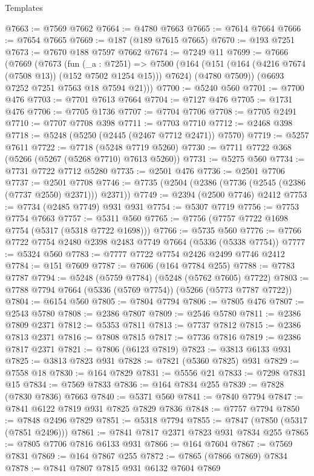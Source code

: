 \begin{lexlean}{Templates}
\begin{coremodule}
@7663 := @7569 @7662
@7664 := @4780 @7663
@7665 := @7614 @7664
@7666 := @7654 @7665
@7669 := @187 (@189 @7615 @7665)
@7670 := @193 @7251
@7673 := @7670 @188 @7597 @7662
@7674 := @7249 @11
@7699 := @7666
    (@7669
      (@7673
        (fun (_a : @7251) =>
        @7500
          (@164 (@151 (@164 (@4216 @7674 (@7508 @13)) (@152 @7502 @1254 @15))) @7624)
          (@4780 @7509))
        (@6693 @7252 @7251 @7563 @18 @7594 @21)))
@7700 := @5240 @560
@7701 := @7700 @476
@7703 := @7701 @7613 @7664
@7704 := @7127 @476
@7705 := @1731 @476
@7706 := @7705 @1736
@7707 := @7704 @7706
@7708 := @7705 @2491
@7710 := @7707 @7708 @398
@7711 := @7703 @7710
@7712 := @2468 @398
@7718 := @5248 (@5250 (@2445 (@2467 @7712 @2471)) @7570)
@7719 := @5257 @7611
@7722 := @7718 (@5248 @7719 @5260)
@7730 := @7711 @7722 @368 (@5266 (@5267 (@5268 @7710) @7613 @5260))
@7731 := @5275 @560
@7734 := @7731 @7722 @7712 @5280
@7735 := @2501 @476
@7736 := @2501 @7706
@7737 := @2501 @7708
@7746 := @7735 (@2504 (@2386 (@7736 (@2545 (@2386 (@7737 @2550) @2371))) @2371))
@7749 := @2394 (@2500 @7746) @2412
@7753 := @7734 (@2485 @7749) @931 @931
@7754 := @5307 @7719
@7756 := @7753 @7754 @7663
@7757 := @5311 @560
@7765 := @7756 (@7757 @7722 @1698 @7754 (@5317 (@5318 @7722 @1698)))
@7766 := @5735 @560
@7776 := @7766 @7722 @7754 @2480 @2398 @2483 @7749 @7664 (@5336 (@5338 @7754))
@7777 := @5324 @560
@7783 := @7777 @7722 @7754 @2426 @2499 @7746 @2412
@7784 := @151 @7609
@7787 := @7606 (@164 @7784 @255)
@7788 := @7783 @7787
@7794 := @5248 (@5759 @7784) (@5248 (@5762 @7605) @7722)
@7803 := @7788 @7794 @7664 (@5336 (@5769 @7754)) (@5266 (@5773 @7787 @7722))
@7804 := @6154 @560
@7805 := @7804 @7794
@7806 := @7805 @476
@7807 := @2543 @5780
@7808 := @2386 @7807
@7809 := @2546 @5780
@7811 := @2386 @7809 @2371
@7812 := @5353 @7811
@7813 := @7737 @7812
@7815 := @2386 @7813 @2371
@7816 := @7808 @7815
@7817 := @7736 @7816
@7819 := @2386 @7817 @2371
@7821 := @7806 (@6123 @7819)
@7823 := @3813 @6133 @931
@7825 := @3813 @7823 @931
@7828 := @7821 (@5360 @7825) @931
@7829 := @7558 @18
@7830 := @164 @7829
@7831 := @5556 @21
@7833 := @7298 @7831 @15
@7834 := @7569 @7833
@7836 := @164 @7834 @255
@7839 := @7828 (@7830 @7836) @7663
@7840 := @5371 @560
@7841 := @7840 @7794
@7847 := @7841 @6122 @7819 @931 @7825 @7829 @7836
@7848 := @7757 @7794
@7850 := @7848 @2496 @7829
@7851 := @5318 @7794
@7855 := @7847 (@7850 (@5317 (@7851 @2496)))
@7861 := @7841 @7817 @2371 @7823 @931 @7834 @255
@7865 := @7805 @7706 @7816 @6133 @931
@7866 := @164 @7604
@7867 := @7569 @7831
@7869 := @164 @7867 @255
@7872 := @7865 (@7866 @7869) @7834
@7878 := @7841 @7807 @7815 @931 @6132 @7604 @7869

\end{coremodule}
\end{lexlean}
